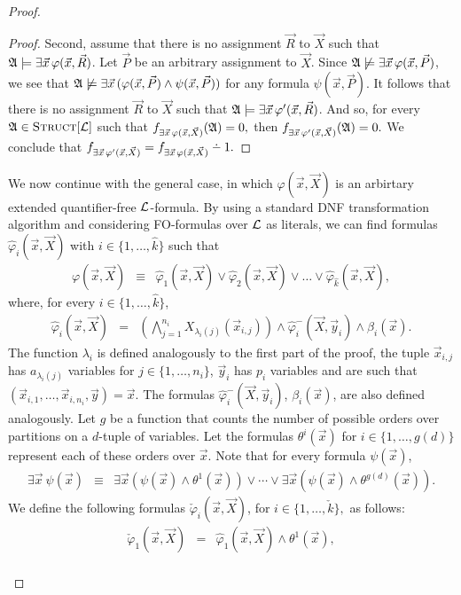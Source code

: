 \documentclass[12pt]{article}
\def\dotminus{\mathbin{\ooalign{\hss\raise1ex\hbox{.}\hss\cr
  \mathsurround=0pt$-$}}}
\def\Truc{\textsc{Struct}[\L]}
\def\A{{\frak A}}
\def\L{{\cal L}}
\def\P{\vec{P}}
\def\R{\vec{R}}
\def\X{\vec{X}}
\def\x{\vec{x}} %
\def\y{\vec{y}} %
\begin{document}
\begin{proof}
\begin{enumerate}
\begin{proof}
Second, assume that there is no assignment $\R$ to $\X$ such that $\A\models\exists\x\,\varphi(\x,\R)$. Let $\P$ be an arbitrary assignment to $\X$. Since $\A\not\models\exists\x\,\varphi(\x,\P)$, we see that $\A\not\models\exists\x\,(\varphi(\x,\P)\wedge\psi(\x,\P))$ for any formula $\psi(\x,\P)$. It follows that there is no assignment $\R$ to $\X$ such that $\A\models\exists\x\,\varphi^\prime(\x,\R)$. And so, for every $\A\in\Truc$ such that $f_{\exists\x\,\varphi(\x,\X)}(\A)=0,$ then $f_{\exists\x\,\varphi^\prime(\x,\X)}(\A) = 0.$ We conclude that $f_{\exists\x\,\varphi^\prime(\x,\X)} = f_{\exists\x\,\varphi(\x,\X)}\dotminus 1.$
\end{proof}

We now continue with the general case, in which $\varphi(\x,\X)$ is an arbirtary extended quantifier-free $\L$-formula. By using a standard DNF transformation algorithm and considering FO-formulas over $\L$ as literals, we can find formulas $\hat{\varphi}_i(\x,\X)$ with $i\in\{1,\ldots,\hat{k}\}$ such that
\begin{eqnarray*}
\varphi(\x,\X) &\equiv& \hat{\varphi}_1(\x,\X) \vee \hat{\varphi}_2(\x,\X) \vee \dots  \vee \hat{\varphi}_{\hat{k}}(\x,\X),
\end{eqnarray*}
where, for every $i\in\{1,\ldots,\hat{k}\}$, 
\begin{eqnarray*}
\hat{\varphi}_i(\x,\X) &=& \left( \bigwedge_{j=1}^{n_i} X_{\lambda_i(j)}(\x_{i,j}) \right) \wedge \hat{\varphi}^{-}_i(\X,\y_i)  \wedge \beta_i(\x).
\end{eqnarray*}
The function $\lambda_i$ is defined analogously to the first part of the proof, the tuple $\x_{i,j}$ has $a_{\lambda_i(j)}$ variables for $j\in\{1,\ldots,n_i\}$, $\y_i$ has $p_i$ variables and are such that $(\x_{i,1},\ldots,\x_{i,n_i},\y) = \x.$ The formulas $\hat{\varphi}^{-}_i(\X,\y_i)$, $\beta_i(\x)$, are also defined analogously. Let $g$ be a function that counts the number of possible orders over partitions on a $d$-tuple of variables. Let the formulas $\theta^i(\x)$ for $i\in\{1,\ldots,g(d)\}$ represent each of these orders over $\x$. Note that for every formula $\psi(\x)$,
\begin{eqnarray*}
\exists\x\:\psi(\x) &\equiv& \exists\x(\psi(\x)\wedge\theta^1(\x)) \vee \cdots \vee \exists\x(\psi(\x)\wedge\theta^{g(d)}(\x)).
\end{eqnarray*}
We define the following formulas $\check{\varphi}_i(\x,\X)$, for $i\in\{1,\ldots,\check{k}\},$ as follows: 
\begin{eqnarray*}
\check{\varphi}_1(\x,\X) &=& \hat{\varphi}_1(\x,\X) \wedge \theta^1(\x), \\

\end{eqnarray*}
\end{enumerate}
\end{proof}
\end{document}
